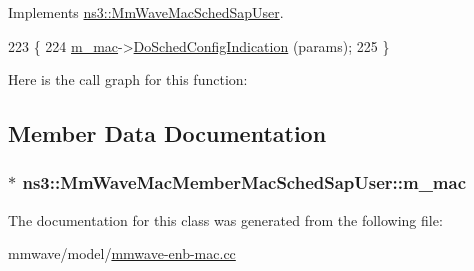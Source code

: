 Implements \hyperlink{classns3_1_1MmWaveMacSchedSapUser_ac164dd52215c3924cf421b56089eece4}{ns3\+::\+Mm\+Wave\+Mac\+Sched\+Sap\+User}.


\begin{DoxyCode}
223 \{
224         \hyperlink{classns3_1_1MmWaveMacMemberMacSchedSapUser_ad26522db9de8015a589129243b8ed387}{m\_mac}->\hyperlink{classns3_1_1MmWaveEnbMac_a2aeea39c3c0088af00ceaa7177bbf552}{DoSchedConfigIndication} (params);
225 \}
\end{DoxyCode}


Here is the call graph for this function\+:




\subsection{Member Data Documentation}
\subsubsection[{\texorpdfstring{m\+\_\+mac}{m_mac}}]{$\ast$ ns3\+::\+Mm\+Wave\+Mac\+Member\+Mac\+Sched\+Sap\+User\+::m\+\_\+mac\hspace{0.3cm}{\ttfamily [private]}}\hypertarget{classns3_1_1MmWaveMacMemberMacSchedSapUser_ad26522db9de8015a589129243b8ed387}{}\label{classns3_1_1MmWaveMacMemberMacSchedSapUser_ad26522db9de8015a589129243b8ed387}


The documentation for this class was generated from the following file\+:\begin{DoxyCompactItemize}
\item 
mmwave/model/\hyperlink{mmwave-enb-mac_8cc}{mmwave-\/enb-\/mac.\+cc}\end{DoxyCompactItemize}
